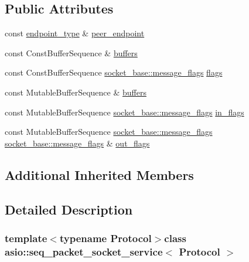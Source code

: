 \subsection*{Public Attributes}
\begin{DoxyCompactItemize}
\item 
const \hyperlink{classasio_1_1seq__packet__socket__service_ade8f7b83e2a45da7bbdc473deaf25075}{endpoint\+\_\+type} \& \hyperlink{classasio_1_1seq__packet__socket__service_a4423f9f6b399d358e6ff2856662765c1}{peer\+\_\+endpoint}
\item 
const Const\+Buffer\+Sequence \& \hyperlink{classasio_1_1seq__packet__socket__service_ab6c8a16f80485fbb3cdf144b335bb9ee}{buffers}
\item 
const Const\+Buffer\+Sequence \hyperlink{classasio_1_1socket__base_ac3cf77465dfedfe1979b5415cf32cc94}{socket\+\_\+base\+::message\+\_\+flags} \hyperlink{classasio_1_1seq__packet__socket__service_a51223946b3c10b64f0d7fc0f1ca0227c}{flags}
\item 
const Mutable\+Buffer\+Sequence \& \hyperlink{classasio_1_1seq__packet__socket__service_a820f896bd3a6c0373bbae920831ba146}{buffers}
\item 
const Mutable\+Buffer\+Sequence \hyperlink{classasio_1_1socket__base_ac3cf77465dfedfe1979b5415cf32cc94}{socket\+\_\+base\+::message\+\_\+flags} \hyperlink{classasio_1_1seq__packet__socket__service_af6a9566db676cb05aa05680d4d215245}{in\+\_\+flags}
\item 
const Mutable\+Buffer\+Sequence \hyperlink{classasio_1_1socket__base_ac3cf77465dfedfe1979b5415cf32cc94}{socket\+\_\+base\+::message\+\_\+flags} \hyperlink{classasio_1_1socket__base_ac3cf77465dfedfe1979b5415cf32cc94}{socket\+\_\+base\+::message\+\_\+flags} \& \hyperlink{classasio_1_1seq__packet__socket__service_a5e754db990933b1a14ec37587e80d825}{out\+\_\+flags}
\end{DoxyCompactItemize}
\subsection*{Additional Inherited Members}


\subsection{Detailed Description}
\subsubsection*{template$<$typename Protocol$>$class asio\+::seq\+\_\+packet\+\_\+socket\+\_\+service$<$ Protocol $>$}

